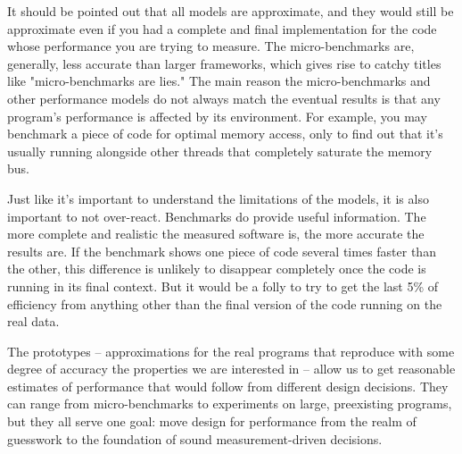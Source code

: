 It should be pointed out that all models are approximate, and they would still be approximate even if you had a complete and final implementation for the code whose performance you are trying to measure. The micro-benchmarks are, generally, less accurate than larger frameworks, which gives rise to catchy titles like "micro-benchmarks are lies." The main reason the micro-benchmarks and other performance models do not always match the eventual results is that any program's performance is affected by its environment. For example, you may benchmark a piece of code for optimal memory access, only to find out that it's usually running alongside other threads that completely saturate the memory bus. 

Just like it's important to understand the limitations of the models, it is also important to not over-react. Benchmarks do provide useful information. The more complete and realistic the measured software is, the more accurate the results are. If the benchmark shows one piece of code several times faster than the other, this difference is unlikely to disappear completely once the code is running in its final context. But it would be a folly to try to get the last 5\% of efficiency from anything other than the final version of the code running on the real data.

The prototypes – approximations for the real programs that reproduce with some degree of accuracy the properties we are interested in – allow us to get reasonable estimates of performance that would follow from different design decisions. They can range from micro-benchmarks to experiments on large, preexisting programs, but they all serve one goal: move design for performance from the realm of guesswork to the foundation of sound measurement-driven decisions. 
